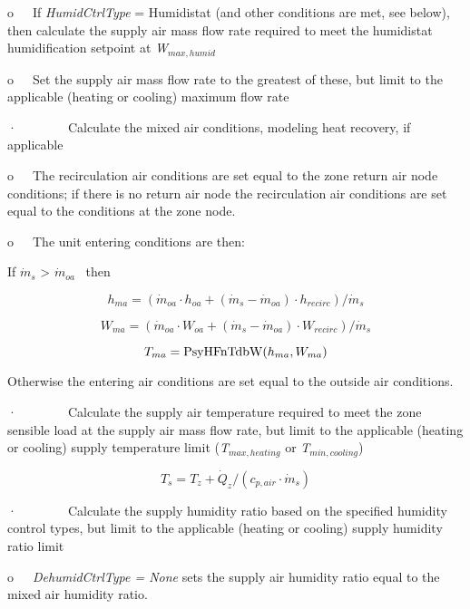 o~~~If \emph{HumidCtrlType} = Humidistat (and other conditions are met, see below), then calculate the supply air mass flow rate required to meet the humidistat humidification setpoint at \emph{W\(_{max,humid}\)}

o~~~Set the supply air mass flow rate to the greatest of these, but limit to the applicable (heating or cooling) maximum flow rate

·~~~~~~~~Calculate the mixed air conditions, modeling heat recovery, if applicable

o~~~The recirculation air conditions are set equal to the zone return air node conditions; if there is no return air node the recirculation air conditions are set equal to the conditions at the zone node.

o~~~The unit entering conditions are then:

If \({\dot m_s}\) \textgreater{} \({\dot m_{oa}}\) ~then

\begin{equation}
{h_{ma}} = ({\dot m_{oa}} \cdot {h_{oa}} + ({\dot m_s} - {\dot m_{oa}}) \cdot {h_{recirc}})/{\dot m_s}
\end{equation}

\begin{equation}
{W_{ma}} = ({\dot m_{oa}} \cdot {W_{oa}} + ({\dot m_s} - {\dot m_{oa}}) \cdot {W_{recirc}})/{\dot m_s}
\end{equation}

\begin{equation}
{T_{ma}} = {\mathop{\rm PsyHFnTdbW}\nolimits} ({h_{ma}},{W_{ma}})
\end{equation}

Otherwise the entering air conditions are set equal to the outside air conditions.

·~~~~~~~~Calculate the supply air temperature required to meet the zone sensible load at the supply air mass flow rate, but limit to the applicable (heating or cooling) supply temperature limit (\emph{T\(_{max,heating}\)} or \emph{T\(_{min,cooling}\)})

\begin{equation}
{T_s} = {T_z} + {\dot Q_z}/({c_{p,air}}\cdot {\dot m_s})
\end{equation}

·~~~~~~~~Calculate the supply humidity ratio based on the specified humidity control types, but limit to the applicable (heating or cooling) supply humidity ratio limit

o~~~\emph{DehumidCtrlType = None} sets the supply air humidity ratio equal to the mixed air humidity ratio.

